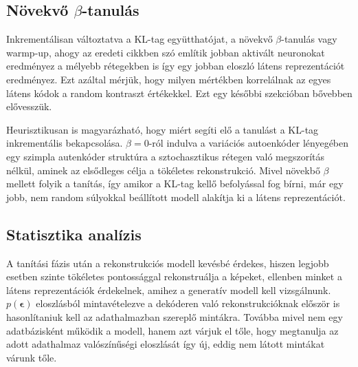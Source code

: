 \documentclass[12pt, english]{article}
\begin{document}
\vspace{5mm}

\subsection{Növekvő $\beta$-tanulás}

\vspace{5mm}

\par Inkrementálisan változtatva a KL-tag együtthatójat, a növekvő $\beta$-tanulás vagy warmp-up, ahogy az eredeti cikkben \cite{sonderby2016ladder} szó említik jobban aktivált neuronokat eredményez a mélyebb rétegekben is így egy jobban eloszló látens reprezentációt eredményez. Ezt azáltal mérjük, hogy milyen mértékben korrelálnak az egyes látens kódok a random kontraszt értékekkel. Ezt egy későbbi szekcióban bővebben elővesszük.

\vspace{4mm}

\par Heurisztikusan is magyarázható, hogy miért segíti elő a tanulást a KL-tag inkrementális bekapcsolása. $\beta = 0$-ról indulva a variációs autoenkóder lényegében egy szimpla autenkóder struktúra a sztochasztikus rétegen való megszorítás nélkül, aminek az elsődleges célja a tökéletes rekonstrukció. Mivel növekbő $\beta$ mellett folyik a tanítás, így amikor a KL-tag kellő befolyással fog bírni, már egy jobb, nem random súlyokkal beállított modell alakítja ki a látens reprezentációt.  

\vspace{5mm}

\subsection{Statisztika analízis}

\vspace{5mm}

\par A tanítási fázis után a rekonstrukciós modell kevésbé érdekes, hiszen legjobb esetben szinte tökéletes pontossággal rekonstruálja a képeket, ellenben minket a látens reprezentációk érdekelnek, amihez a generatív modell kell vizsgálnunk. $p(\bm{\epsilon})$ eloszlásból mintavételezve a dekóderen való rekonstrukcióknak először is hasonlítaniuk kell az adathalmazban szereplő mintákra. Továbba mivel nem egy adatbázisként működik a modell, hanem azt várjuk el tőle, hogy megtanulja az adott adathalmaz valószínűségi eloszlását így új, eddig nem látott mintákat várunk tőle.
\end{document}
